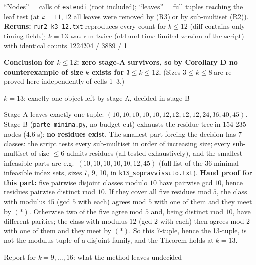 ``Nodes'' = calls of \texttt{estendi} (root included); ``leaves'' = full
tuples reaching the leaf test (at \(k=11,12\) all leaves were removed by
(R3) or by sub-multiset (R2)). \textbf{Reruns:}
\texttt{run2\_k3\_12.txt} reproduces every count for \(k\le12\) (diff
contains only timing fields); \(k=13\) was run twice (old and
time-limited version of the script) with identical counts 1224204 / 3889
/ 1.

\textbf{Conclusion for \(k\le12\): zero stage-A survivors, so by
Corollary D no counterexample of size \(k\) exists for \(3\le k\le12\).}
(Sizes \(3\le k\le8\) are re-proved here independently of cells 1--3.)

\(k=13\): exactly one object left by stage A, decided in stage B

Stage A leaves exactly one tuple:
\((10,10,10,10,10,12,12,12,12,24,36,40,45)\). Stage B
(\texttt{parte\_minima.py}, no budget cut) exhausts the residue tree in
154 235 nodes (4.6 s): \textbf{no residues exist}. The smallest part
forcing the decision has 7 classes: the script tests every sub-multiset
in order of increasing size; every sub-multiset of size \(\le6\) admits
residues (all tested exhaustively), and the smallest infeasible parts
are e.g.~\((10,10,10,10,10,12,45)\) (full list of the 36 minimal
infeasible index sets, sizes 7, 9, 10, in
\texttt{k13\_sopravvissuto.txt}). \textbf{Hand proof for this part:}
five pairwise disjoint classes modulo \(10\) have pairwise gcd \(10\),
hence residues pairwise distinct mod \(10\). If they cover all five
residues mod \(5\), the class with modulus \(45\) (gcd \(5\) with each)
agrees mod \(5\) with one of them and they meet by \((*)\). Otherwise
two of the five agree mod \(5\) and, being distinct mod \(10\), have
different parities; the class with modulus \(12\) (gcd \(2\) with each)
then agrees mod \(2\) with one of them and they meet by \((*)\). So this
7-tuple, hence the 13-tuple, is not the modulus tuple of a disjoint
family, and the Theorem holds at \(k=13\).

Report for \(k=9,\dots,16\): what the method leaves undecided

